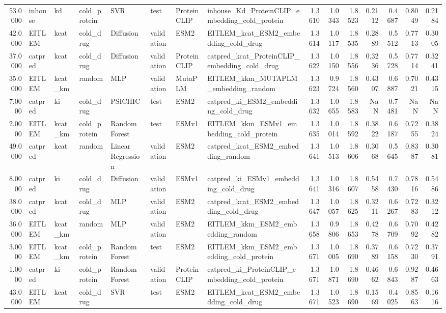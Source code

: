 \begin{tabular}{rlllllllrrrrrrr}
53.0000 & inhouse & kd & cold_protein & SVR & test & ProteinCLIP & inhouse_Kd_ProteinCLIP_embedding_cold_protein & 1.3610 & 1.0343 & 1.8523 & 0.2112 & 0.4687 & 0.8049 & 0.2184 \\
42.0000 & EITLEM & kcat & cold_drug & Diffusion & validation & ESM2 & EITLEM_kcat_ESM2_embedding_cold_drug & 1.3614 & 1.0117 & 1.8535 & 0.2889 & 0.5512 & 0.7713 & 0.3005 \\
37.0000 & catpred & kcat & cold_drug & Diffusion & validation & ProteinCLIP & catpred_kcat_ProteinCLIP_embedding_cold_drug & 1.3622 & 1.0150 & 1.8556 & 0.3236 & 0.5728 & 0.7714 & 0.3241 \\
35.0000 & EITLEM & kcat_km & random & MLP & validation & MutaPLM & EITLEM_kkm_MUTAPLM_embedding_random & 1.3623 & 0.9724 & 1.8560 & 0.4307 & 0.6887 & 0.7021 & 0.4315 \\
7.0000 & catpred & ki & cold_drug & PSICHIC & test & ESM2 & catpred_ki_ESM2_embedding_cold_drug & 1.3632 & 1.0655 & 1.8583 & NaN & 0.7481 & NaN & NaN \\
2.0000 & EITLEM & kcat_km & cold_protein & Random Forest & test & ESMv1 & EITLEM_kkm_ESMv1_embedding_cold_protein & 1.3635 & 1.0014 & 1.8592 & 0.3822 & 0.6187 & 0.7255 & 0.3824 \\
49.0000 & catpred & kcat & random & Linear Regression & validation & ESM2 & catpred_kcat_ESM2_embedding_random & 1.3641 & 1.0513 & 1.8606 & 0.3068 & 0.5645 & 0.8387 & 0.3081 \\
8.0000 & catpred & ki & cold_drug & Diffusion & validation & ESMv1 & catpred_ki_ESMv1_embedding_cold_drug & 1.3641 & 1.0316 & 1.8607 & 0.5458 & 0.7430 & 0.7816 & 0.5486 \\
38.0000 & catpred & kcat & cold_drug & MLP & validation & ESM2 & catpred_kcat_ESM2_embedding_cold_drug & 1.3647 & 1.0057 & 1.8625 & 0.3211 & 0.6267 & 0.7283 & 0.3212 \\
36.0000 & EITLEM & kcat_km & random & MLP & validation & ESM2 & EITLEM_kkm_ESM2_embedding_random & 1.3658 & 0.9806 & 1.8653 & 0.4278 & 0.6709 & 0.7092 & 0.4282 \\
3.0000 & EITLEM & kcat_km & cold_protein & Random Forest & test & ESM2 & EITLEM_kkm_ESM2_embedding_cold_protein & 1.3671 & 1.0005 & 1.8690 & 0.3789 & 0.6158 & 0.7230 & 0.3791 \\
1.0000 & catpred & ki & cold_protein & Random Forest & validation & ProteinCLIP & catpred_ki_ProteinCLIP_embedding_cold_protein & 1.3671 & 1.0871 & 1.8690 & 0.4662 & 0.6843 & 0.9287 & 0.4663 \\
43.0000 & EITLEM & kcat & cold_drug & SVR & test & ESM2 & EITLEM_kcat_ESM2_embedding_cold_drug & 1.3671 & 1.0523 & 1.8690 & 0.1569 & 0.4025 & 0.8563 & 0.1616 \\

\end{tabular}
